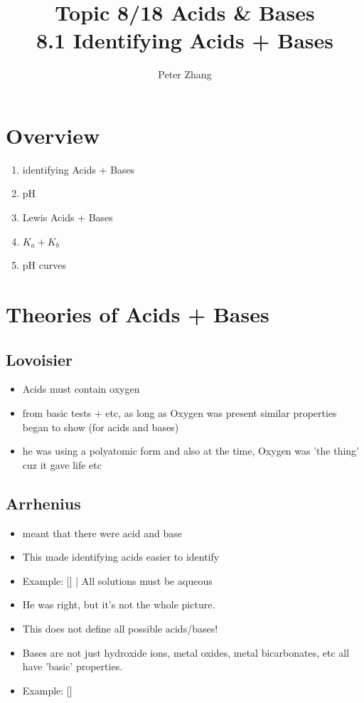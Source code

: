 \documentclass{article}
\title{Topic 8/18 Acids \& Bases\\8.1 Identifying Acids + Bases}
\author{Peter Zhang}
\begin{document}
\maketitle
\newpage
\tableofcontents
\newpage


\section{Overview}
\begin{enumerate}
\item identifying Acids + Bases
\item pH
\item Lewis Acids + Bases
\item $K_{a} + K_{b}$
\item pH curves
\end{enumerate}

\section{Theories of Acids + Bases}
\subsection{Lovoisier}
\begin{itemize} \item Acids must contain oxygen \item from basic tests + etc, as long as Oxygen was present similar properties began to show (for acids and bases) \item he was using a polyatomic form and also at the time, Oxygen was 'the thing' cuz it gave life etc \end{itemize}
\subsection{Arrhenius}
\begin{itemize} \item {} meant that there were acid and base \item This made identifying acids easier to identify \item Example: [] | All solutions must be aqueous \item He was right, but it's not the whole picture. \item This does not define all possible acids/bases! \item Bases are not just hydroxide ions, metal oxides, metal bicarbonates, etc all have 'basic' properties. \item Example: [] \end{itemize}
\end{document}

